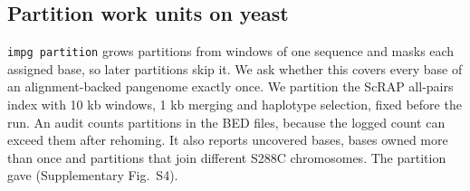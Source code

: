 \subsection{Partition work units on yeast}
\label{sec:res-partition}

\texttt{impg partition} grows partitions from windows of one sequence and masks each assigned base, so later partitions skip it.
We ask whether this covers every base of an alignment-backed pangenome exactly once.
We partition the ScRAP all-pairs index with 10 kb windows, 1 kb merging and haplotype selection, fixed before the run.
An audit counts partitions in the BED files, because the logged count can exceed them after rehoming.
It also reports uncovered bases, bases owned more than once and partitions that join different S288C chromosomes.
The partition gave  (Supplementary Fig.~S4).
